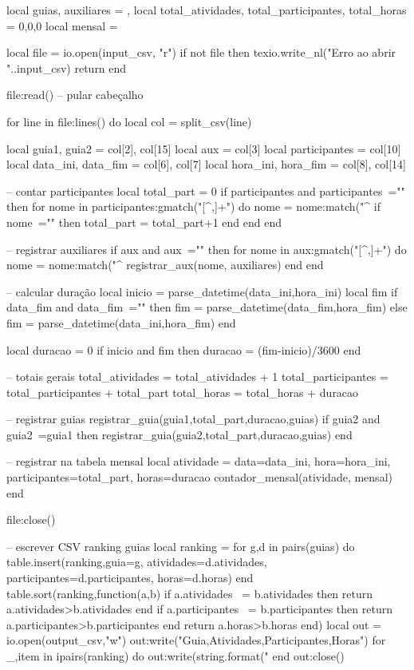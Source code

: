 \begin{luacode*}
{{  local guias, auxiliares = {}, {}
  local total_atividades, total_participantes, total_horas = 0,0,0
  local mensal = {}

  local file = io.open(input_csv, "r")
  if not file then
    texio.write_nl("Erro ao abrir "..input_csv)
    return
  end

  file:read() -- pular cabeçalho

  for line in file:lines() do
    local col = split_csv(line)

    local guia1, guia2 = col[2], col[15]
    local aux = col[3]
    local participantes = col[10]
    local data_ini, data_fim = col[6], col[7]
    local hora_ini, hora_fim = col[8], col[14]

    -- contar participantes
    local total_part = 0
    if participantes and participantes~="" then
      for nome in participantes:gmatch("[^,]+") do
        nome = nome:match("^%
        if nome~="" then total_part = total_part+1 end
      end
    end

    -- registrar auxiliares
    if aux and aux~="" then
      for nome in aux:gmatch("[^,]+") do
        nome = nome:match("^%
        registrar_aux(nome, auxiliares)
      end
    end

    -- calcular duração
    local inicio = parse_datetime(data_ini,hora_ini)
    local fim
    if data_fim and data_fim~="" then
      fim = parse_datetime(data_fim,hora_fim)
    else
      fim = parse_datetime(data_ini,hora_fim)
    end

    local duracao = 0
    if inicio and fim then duracao = (fim-inicio)/3600 end

    -- totais gerais
    total_atividades = total_atividades + 1
    total_participantes = total_participantes + total_part
    total_horas = total_horas + duracao

    -- registrar guias
    registrar_guia(guia1,total_part,duracao,guias)
    if guia2 and guia2~=guia1 then
      registrar_guia(guia2,total_part,duracao,guias)
    end

    -- registrar na tabela mensal
    local atividade = {data=data_ini, hora=hora_ini, participantes=total_part, horas=duracao}
    contador_mensal(atividade, mensal)
  end

  file:close()

  -- escrever CSV ranking guias
  local ranking = {}
  for g,d in pairs(guias) do
    table.insert(ranking,{guia=g, atividades=d.atividades, participantes=d.participantes, horas=d.horas})
  end
  table.sort(ranking,function(a,b)
    if a.atividades ~= b.atividades then return a.atividades>b.atividades end
    if a.participantes ~= b.participantes then return a.participantes>b.participantes end
    return a.horas>b.horas
  end)
  local out = io.open(output_csv,"w")
  out:write("Guia,Atividades,Participantes,Horas\n")
  for _,item in ipairs(ranking) do
    out:write(string.format("%
  end
  out:close()

}}
\end{luacode*}
